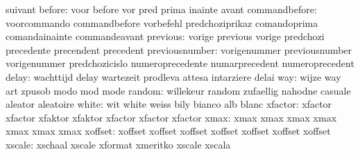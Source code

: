                            suivant
                   before: voor                      before
                           vor                       pred
                           prima                     inainte
                           avant
            commandbefore: voorcommando              commandbefore
                           vorbefehl                 predchoziprikaz
                           comandoprima              comandainainte
                           commandeavant
                 previous: vorige                    previous
                           vorige                    predchozi
                           precedente                precendent
                           precedent
           previousnumber: vorigenummer              previousnumber
                           vorigenummer              predchozicislo
                           numeroprecedente          numarprecedent
                           numeroprecedent
                    delay: wachttijd                 delay
                           wartezeit                 prodleva
                           attesa                    intarziere
                           delai
                      way: wijze                     way
                           art                       zpusob
                           modo                      mod
                           mode
                   random: willekeur                 random
                           zufaellig                 nahodne
                           casuale                   aleator
                           aleatoire
                    white: wit                       white
                           weiss                     bily
                           bianco                    alb
                           blanc
                  xfactor: xfactor                   xfactor
                           xfaktor                   xfaktor
                           xfactor                   xfactor
                           xfactor
                     xmax: xmax                      xmax
                           xmax                      xmax
                           xmax                      xmax
                           xmax
                  xoffset: xoffset                   xoffset
                           xoffset                   xoffset
                           xoffset                   xoffset
                           xoffset
                   xscale: xschaal                   xscale
                           xformat                   xmeritko
                           xscale                    xscala
